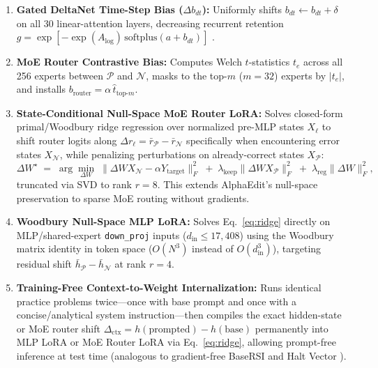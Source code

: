 \documentclass[10pt]{article}
\begin{document}
\begin{enumerate}[leftmargin=1.4em,itemsep=2pt,topsep=2pt]
    \item \textbf{Gated DeltaNet Time-Step Bias ($\Delta b_{dt}$):} Uniformly shifts $b_{dt} \leftarrow b_{dt} + \delta$ on all 30 linear-attention layers, decreasing recurrent retention $g = \exp[-\exp(A_{\log})\,\mathrm{softplus}(a+b_{dt})]$ \citep{yang2025gateddelta,fan2026selfrewriting}.
    \item \textbf{MoE Router Contrastive Bias:} Computes Welch $t$-statistics $t_e$ across all 256 experts between $\mathcal{P}$ and $\mathcal{N}$, masks to the top-$m$ ($m=32$) experts by $|t_e|$, and installs $b_{\mathrm{router}} = \alpha\,\hat{t}_{\mathrm{top}\text{-}m}$.
    \item \textbf{State-Conditional Null-Space MoE Router LoRA:} Solves closed-form primal/Woodbury ridge regression over normalized pre-MLP states $X_\ell$ to shift router logits along $\Delta r_\ell = \bar{r}_{\mathcal{P}} - \bar{r}_{\mathcal{N}}$ specifically when encountering error states $X_{\mathcal{N}}$, while penalizing perturbations on already-correct states $X_{\mathcal{P}}$:
    \begin{equation}
    \label{eq:ridge}
    \Delta W^\star \;=\; \arg\min_{\Delta W}\; \|\Delta W X_{\mathcal{N}} - \alpha Y_{\mathrm{target}}\|_F^2 \;+\; \lambda_{\mathrm{keep}}\|\Delta W X_{\mathcal{P}}\|_F^2 \;+\; \lambda_{\mathrm{reg}}\|\Delta W\|_F^2,
    \end{equation}
    truncated via SVD to rank $r=8$. This extends AlphaEdit's null-space preservation \citep{fang2025alphaedit} to sparse MoE routing without gradients.
    \item \textbf{Woodbury Null-Space MLP LoRA:} Solves Eq.~\eqref{eq:ridge} directly on MLP/shared-expert \texttt{down\_proj} inputs ($d_{\mathrm{in}}\le 17{,}408$) using the Woodbury matrix identity in token space ($O(N^3)$ instead of $O(d_{\mathrm{in}}^3)$), targeting residual shift $\bar{h}_{\mathcal{P}} - \bar{h}_{\mathcal{N}}$ at rank $r=4$.
    \item \textbf{Training-Free Context-to-Weight Internalization:} Runs identical practice problems twice---once with base prompt and once with a concise/analytical system instruction---then compiles the exact hidden-state or MoE router shift $\Delta_{\mathrm{ctx}} = h(\text{prompted}) - h(\text{base})$ permanently into MLP LoRA or MoE Router LoRA via Eq.~\eqref{eq:ridge}, allowing prompt-free inference at test time (analogous to gradient-free BaseRSI \citealt{zhang2026basersi} and Halt Vector \citealt{jayabahu2026halt}).
\end{enumerate}
\end{document}
